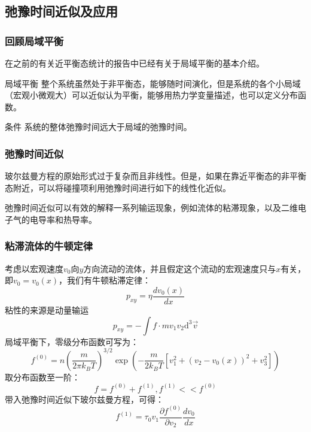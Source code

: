 \documentclass{if-beamer}
\begin{document}
\subsection{弛豫时间近似及应用}
\begin{frame}
    \frametitle{回顾局域平衡}
    在之前的有关近平衡态统计的报告中已经有关于局域平衡的基本介绍。
    \begin{block}
        {局域平衡}
        整个系统虽然处于非平衡态，能够随时间演化，但是系统的各个小局域（宏观小微观大）可以近似认为平衡，能够用热力学变量描述，也可以定义分布函数。
    \end{block}
    \begin{block}
        {条件}
        系统的整体弛豫时间远大于局域的弛豫时间。
    \end{block}
    
\end{frame}
\begin{frame}
    \frametitle{弛豫时间近似}
        玻尔兹曼方程的原始形式过于复杂而且非线性。但是，如果在靠近平衡态的非平衡态附近，可以将碰撞项利用弛豫时间进行如下的线性化近似。
    
        弛豫时间近似可以有效的解释一系列输运现象，例如流体的粘滞现象，以及二维电子气的电导率和热导率。
\end{frame}
\begin{frame}
    \frametitle{粘滞流体的牛顿定律}
        考虑以宏观速度$v_0$向$y$方向流动的流体，并且假定这个流动的宏观速度只与$x$有关，即$v_0=v_0(x)$，我们有牛顿粘滞定律：
        \begin{equation*}
            p_{xy}=\eta\frac{dv_0(x)}{dx}
        \end{equation*}
        粘性的来源是动量输运
        \begin{equation*}
            p_{xy}=-\int{f\cdot mv_1v_2\mathrm{d}^3\vec{v}}
        \end{equation*}
        局域平衡下，零级分布函数可写为：
        \begin{equation*}
            f^{(0)}=n\left(\frac{m}{2 \pi k_{B} T}\right)^{3 / 2} \exp \left(-\frac{m}{2 k_{B} T}\left[v_{1}^{2}+\left(v_{2}-v_{0}(x)\right)^{2}+v_{3}^{2}\right]\right)
        \end{equation*}
        取分布函数至一阶：
        \begin{equation*}
            f=f^{(0)}+f^{(1)},f^{(1)}<<f^{(0)}
        \end{equation*}
        带入弛豫时间近似下玻尔兹曼方程，可得：
        \begin{equation*}
            f^{(1)}=\tau_{0} v_{1} \frac{\partial f^{(0)}}{\partial v_{2}} \frac{d v_{0}}{d x}
        \end{equation*}


\end{frame}
\end{document}
